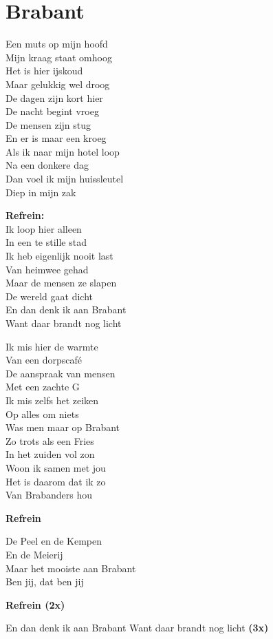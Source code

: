 \section{Brabant}
Een muts op mijn hoofd\\
Mijn kraag staat omhoog\\
Het is hier ijskoud\\
Maar gelukkig wel droog\\
De dagen zijn kort hier\\
De nacht begint vroeg\\
De mensen zijn stug\\
En er is maar een kroeg\\
Als ik naar mijn hotel loop\\
Na een donkere dag\\
Dan voel ik mijn huissleutel\\
Diep in mijn zak

\textbf{Refrein:}\\
Ik loop hier alleen\\
In een te stille stad\\
Ik heb eigenlijk nooit last\\
Van heimwee gehad\\
Maar de mensen ze slapen\\
De wereld gaat dicht\\
En dan denk ik aan Brabant\\
Want daar brandt nog licht

Ik mis hier de warmte\\
Van een dorpscafé\\
De aanspraak van mensen\\
Met een zachte G\\
Ik mis zelfs het zeiken\\
Op alles om niets\\
Was men maar op Brabant\\
Zo trots als een Fries\\
In het zuiden vol zon\\
Woon ik samen met jou\\
Het is daarom dat ik zo\\
Van Brabanders hou

\textbf{Refrein}

De Peel en de Kempen\\
En de Meierij\\
Maar het mooiste aan Brabant\\
Ben jij, dat ben jij

\textbf{Refrein (2x)}

En dan denk ik aan Brabant Want daar brandt nog licht \textbf{(3x)}
